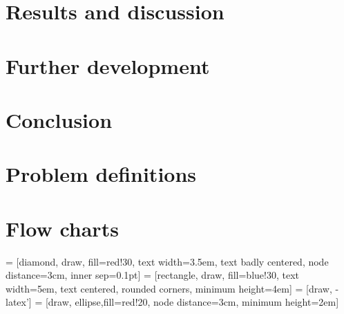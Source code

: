 \documentclass[a4paper, 10pt, twoside, openright]{book}
\begin{document}


%
%

\chapter{Results and discussion}\label{chap:res}


\chapter{Further development}\label{chap:further}


\chapter{Conclusion}\label{chap:concl}







\appendix
\chapter{Problem definitions} \label{definitions}







\chapter{Flow charts} \label{appendix:flow_charts}

 = [diamond, draw, fill=red!30,
    text width=3.5em, text badly centered, node distance=3cm, inner sep=0.1pt]
 = [rectangle, draw, fill=blue!30,
    text width=5em, text centered, rounded corners, minimum height=4em]
 = [draw, -latex']
 = [draw, ellipse,fill=red!20, node distance=3cm,
    minimum height=2em]
\end{document}
